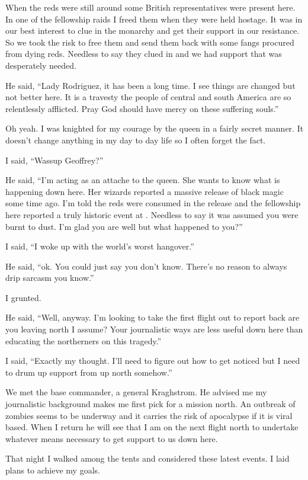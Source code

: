 When the reds were still around some British representatives were present here. In one of the fellowship raids I freed them when they were held hostage. It was in our best interest to clue in the monarchy and get their support in our resistance. So we took the risk to free them and send them back with some fangs procured from dying reds. Needless to say they clued in and we had support that was desperately needed.

He said, ``Lady Rodriguez, it has been a long time. I see things are changed but not better here. It is a travesty the people of central and south America are so relentlessly afflicted. Pray God should have mercy on these suffering souls.''

Oh yeah. I was knighted for my courage by the queen in a fairly secret manner. It doesn't change anything in my day to day life so I often forget the fact.

I said, ``Wassup Geoffrey?''

He said, ``I'm acting as an attache to the queen. She wants to know what is happening down here. Her wizards reported a massive release of black magic some time ago. I'm told the reds were consumed in the release and the fellowship here reported a truly historic event at \chichenitza*. Needless to say it was assumed you were burnt to dust. I'm glad you are well but what happened to you?''

I said, ``I woke up with the world's worst hangover.''

He said, ``ok. You could just say you don't know. There's no reason to always drip sarcasm you know.''

I grunted.

He said, ``Well, anyway. I'm looking to take the first flight out to report back are you leaving north I assume? Your journalistic ways are less useful down here than educating the northerners on this tragedy.''

I said, ``Exactly my thought. I'll need to figure out how to get noticed but I need to drum up support from up north somehow.''

We met the base commander, a general Kraghstrom. He advised me my journalistic background makes me first pick for a mission north. An outbreak of zombies seems to be underway and it carries the risk of apocalypse if it is viral based. When I return he will see that I am on the next flight north to undertake whatever means necessary to get support to us down here.

That night I walked among the tents and considered these latest events. I laid plans to achieve my goals.


